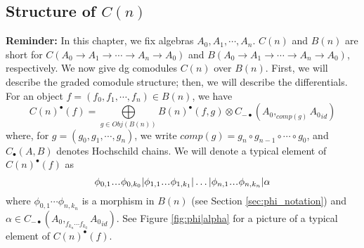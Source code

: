 \subsection{Structure of $C(n)$}
\textbf{Reminder:} In this chapter, we fix algebras $A_0, A_1, \cdots, A_n$.
$C(n)$ and $B(n)$ are short for $C(A_0 \to A_1 \to \cdots \to A_n \to A_0)$
and $B(A_0 \to A_1 \to \cdots \to A_n \to A_0)$, respectively.
\newline
\newline
We now give dg comodules $C(n)$ over $B(n)$.
First, we will describe the graded comodule structure;
then, we will describe the differentials.
For an object $f = (f_0, f_1, \cdots, f_n) \in B(n)$, we have
%
\begin{equation}\label{eq:C(f)}
C(n)^\bullet(f) 
= \bigoplus\limits_{g \in Obj(B(n))} B(n)^\bullet(f,g) \otimes 
C_{-\bullet}(A_0, _{comp(g)}{A_0}_{id})
\end{equation}
%
where, for $g = (g_0, g_1, \cdots, g_n)$, 
we write $comp(g) = g_n \circ g_{n-1} \circ \cdots \circ g_0$,
and $C_\bullet(A,B)$ denotes Hochschild chains.
We will denote a typical element of $C(n)^\bullet(f)$ 
as $$\phi_{0,1}\smdots\phi_{0,k_0} | 
\phi_{1,1}\smdots\phi_{1,k_1} | \dots |
\phi_{n,1}\smdots\phi_{n,k_n} | \alpha$$
where $\phi_{0,1}\cdots \phi_{n,k_n}$ is a morphism
in $B(n)$ (see Section \ref{sec:phi_notation}) and
$\alpha \in C_{-\bullet}(A_0, _{f_{k_n}\cdots f_{k_0}}{A_0}_{id})$.
See Figure \ref{fig:phi|alpha} for a picture of 
a typical element of $C(n)^\bullet(f)$.
